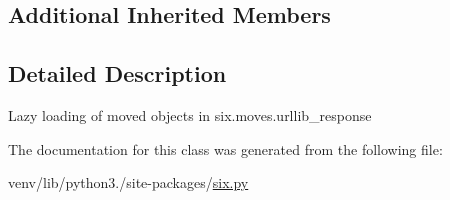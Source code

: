 \subsection*{Additional Inherited Members}


\subsection{Detailed Description}
\begin{DoxyVerb}Lazy loading of moved objects in six.moves.urllib_response\end{DoxyVerb}
 

The documentation for this class was generated from the following file\+:\begin{DoxyCompactItemize}
\item 
venv/lib/python3./site-\/packages/\hyperlink{six_8py}{six.\+py}\end{DoxyCompactItemize}
